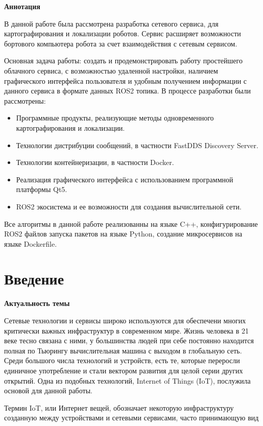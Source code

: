 \documentclass[a4paper, 14pt]{extreport}
\newcommand{\anonchapter}[1]{\chapter*{#1}
\addcontentsline{toc}{chapter}{#1}
}
\begin{document}
\begin{center}
        \textbf{Аннотация}
\end{center}
\par
\vspace{1cm}
\par В данной работе была рассмотрена разработка сетевого сервиса, для картографирования и локализации роботов. Сервис расширяет возможности бортового компьютера
 робота за счет взаимодействия с сетевым сервисом.
\par Основная задача работы: создать и продемонстрировать работу простейшего облачного сервиса, с возможностью удаленной настройки,
 наличием графического интерфейса пользователя и удобным получением информации с данного сервиса в формате данных ROS2 топика.
 В процессе разработки были рассмотрены:
\begin{itemize}
        \item Программные продукты, реализующие методы одновременного картографирования и локализации.
        \item Технологии дистрибуции сообщений, в частности FastDDS Discovery Server.
        \item Технологии контейнеризации, в частности Docker.
        \item Реализация графического интерфейса с использованием программной платформы Qt5.
        \item ROS2 экосистема и ее возможности для создания вычислительной сети.
\end{itemize}
\par\noindent Все алгоритмы в данной работе реализованны на языке C++, конфигурирование ROS2 файлов запуска пакетов на языке Python, создание микросервисов на языке
Dockerfile.
\tableofcontents
\anonchapter{Введение}
\textbf{Актуальность темы}
\vspace{5mm}
\par Сетевые технологии и сервисы широко используются для обеспечени многих критически важных инфраструктур в современном мире.
 Жизнь человека в 21 веке тесно связана с ними, у большинства людей при себе постоянно находится полная по Тьюрингу вычислительная 
 машина с выходом в глобальную сеть. Среди большого числа технологий и устройств, есть те, которые переросли единичное употребление
 и стали вектором развития для целой серии других открытий. Одна из подобных технологий, Internet of Things (IoT)\cite{iotBrief}\cite{iotPrep}, послужила основой
 для данной работы. 
\par Термин IoT, или Интернет вещей, обозначает некоторую инфраструктуру созданную между устройствами и сетевыми сервисами, часто принимающую вид
\end{document}

